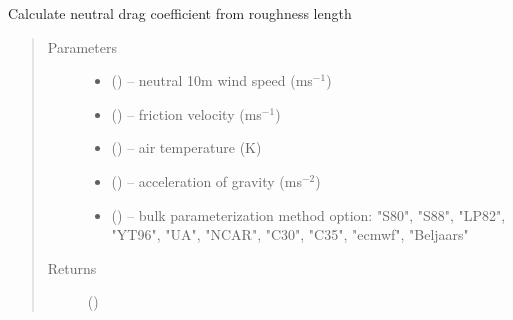 \documentclass[letterpaper,10pt,english]{sphinxmanual}
\begin{document}

\begin{fulllineitems}
\label{\detokenize{index:flux_subs.cdn_from_roughness}}
Calculate neutral drag coefficient from roughness length
\begin{quote}\begin{description}
\item[{Parameters}] \leavevmode\begin{itemize}
\item {} 
 (\href{https://docs.python.org/3/library/functions.html\#float}{}) -- neutral 10m wind speed (ms$^{-1}$)

\item {} 
 (\href{https://docs.python.org/3/library/functions.html\#float}{}) -- friction velocity (ms$^{-1}$)

\item {} 
 (\href{https://docs.python.org/3/library/functions.html\#float}{}) -- air temperature (K)

\item {} 
 (\href{https://docs.python.org/3/library/functions.html\#float}{}) -- acceleration of gravity (ms$^{-2}$)

\item {} 
 (\href{https://docs.python.org/3/library/stdtypes.html\#str}{}) -- bulk parameterization method option: "S80", "S88", "LP82", "YT96", "UA", "NCAR", "C30", "C35", "ecmwf", "Beljaars"
\end{itemize}

\item[{Returns}] \leavevmode
{} (\href{https://docs.python.org/3/library/functions.html\#float}{})

\end{description}\end{quote}

\end{fulllineitems}
\end{document}

